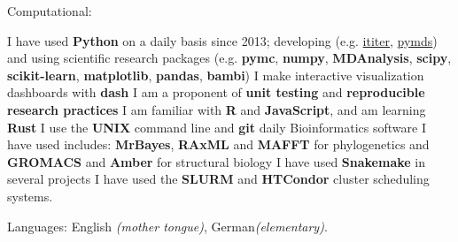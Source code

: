 \documentclass[10pt,a4paper]{article}
\begin{document}
\spacedhrule{0.9em}{-0.4em}


\inlineheadsection  %
{Computational:} {
  
  I have used \textbf{Python} on a daily basis since 2013; developing (e.g.\@
  \href{https://ititer.readthedocs.io/}{ititer},
  \href{https://pymds.readthedocs.io}{pymds}) and using scientific research packages
  (e.g. \textbf{pymc}, \textbf{numpy}, \textbf{MDAnalysis}, \textbf{scipy},
  \textbf{scikit-learn}, \textbf{matplotlib}, \textbf{pandas}, \textbf{bambi}) \sbull I
  make interactive visualization dashboards with \textbf{dash} \sbull I am a proponent of
  \textbf{unit testing} and \textbf{reproducible research practices} \sbull I am familiar
  with \textbf{R} and \textbf{JavaScript}, and am learning \textbf{Rust} \sbull I use the
  \textbf{UNIX} command line and \textbf{git} daily \sbull Bioinformatics software I have
  used includes: \textbf{MrBayes}, \textbf{RAxML} and \textbf{MAFFT} for phylogenetics
  and \textbf{GROMACS} and \textbf{Amber} for structural biology \sbull I have used
  \textbf{Snakemake} in several projects \sbull I have used the \textbf{SLURM} and
  \textbf{HTCondor} cluster scheduling systems.}

\vspace{0.5em}
\inlineheadsection
{Languages:}
{English \emph{(mother tongue)}, German\emph{(elementary)}.}

\spacedhrule{1.6em}{-0.4em}

\nocite{*}
\printbibliography[title=Publications]

\spacedhrule{1.6em}{-0.4em}
\end{document}
